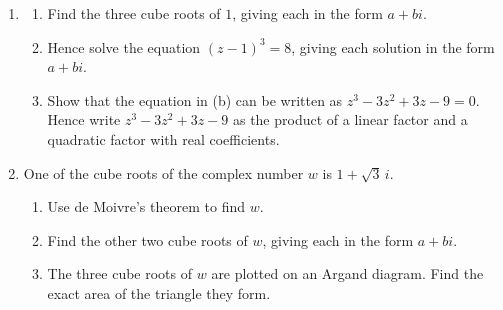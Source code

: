 \documentclass[12pt, twoside]{article}
\begin{document}
\begin{enumerate}[itemsep=0.15cm]

\newpage

\item[3.]

\begin{enumerate}[itemsep=0.15cm]
  \item Find the three cube roots of $1$, giving each in the form $a + bi$.
  \item Hence solve the equation $(z - 1)^{3} = 8$, giving each solution in
  the form $a + bi$.
  \item Show that the equation in (b) can be written as
  $z^{3} - 3z^{2} + 3z - 9 = 0$. Hence write $z^{3} - 3z^{2} + 3z - 9$ as
  the product of a linear factor and a quadratic factor with real
  coefficients.
\end{enumerate}


\newpage

\item[4.]

One of the cube roots of the complex number $w$ is $1 + \sqrt{3}\,i$.

\begin{enumerate}[itemsep=0.15cm]
  \item Use de Moivre's theorem to find $w$.
  \item Find the other two cube roots of $w$, giving each in the form
  $a + bi$.
  \item The three cube roots of $w$ are plotted on an Argand diagram. Find
  the exact area of the triangle they form.
\end{enumerate}


\end{enumerate}
\end{document}
